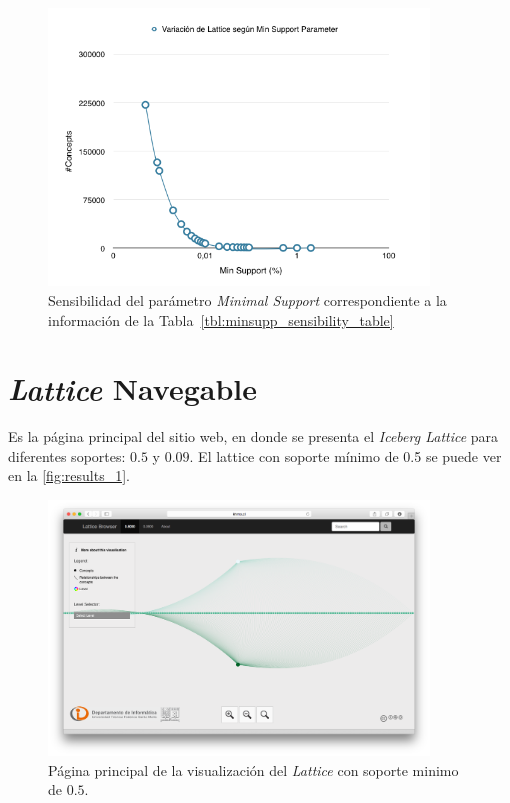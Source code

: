\documentclass[12pt,oneside,letterpaper]{book}
\newcommand{\eng}[1]{\textit{#1}\xspace}			%
\theoremstyle{definition}
\begin{document}
\begin{figure}[h!]
	\centering
	\includegraphics[width=0.90\textwidth]{images/minsupp_sensibility.png}
	\caption{Sensibilidad del parámetro \eng{Minimal Support} correspondiente a la información de la Tabla~\ref{tbl:minsupp_sensibility_table}}
	\label{fig:minsupp_sensibility}
\end{figure} 

\newpage

\section{\eng{Lattice} Navegable}
Es la página principal del sitio web, en donde se presenta el \eng{Iceberg Lattice} para diferentes soportes: $0.5$ y $0.09$. El lattice con soporte mínimo de 0.5 se puede ver en la \autoref{fig:results_1}.

\begin{figure}[h!]
	\centering
	\includegraphics[width=0.90\textwidth]{images/results_1.png}
	\caption{Página principal de la visualización del \eng{Lattice} con soporte minimo de $0.5$.}
	\label{fig:results_1}
\end{figure} 
\end{document}
